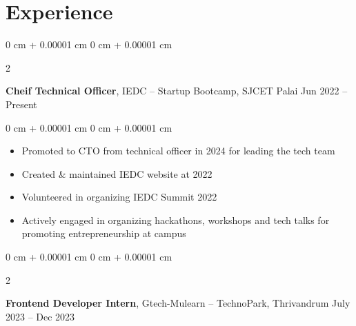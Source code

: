 \documentclass[10pt, letterpaper]{article}
\newenvironment{highlights}{
    \begin{itemize}[
        topsep=0.10 cm,
        parsep=0.10 cm,
        partopsep=0pt,
        itemsep=0pt,
        leftmargin=0 cm + 10pt
    ]
}{
    \end{itemize}
} %
\newenvironment{onecolentry}{
    \begin{adjustwidth}{
        0 cm + 0.00001 cm
    }{
        0 cm + 0.00001 cm
    }
}{
    \end{adjustwidth}
} %
\newenvironment{twocolentry}[2][]{
    \onecolentry
    \def\secondColumn{#2}
    \setcolumnwidth{\fill, 4.5 cm}
    \begin{paracol}{2}
}{
    \switchcolumn \raggedleft \secondColumn
    \end{paracol}
    \endonecolentry
} %
\begin{document}




\section{Experience}

\begin{twocolentry}{
        Jun 2022 – Present
    }
    \textbf{Cheif Technical Officer}, IEDC -- Startup Bootcamp, SJCET Palai\end{twocolentry}

\vspace{0.10 cm}
\begin{onecolentry}
    \begin{highlights}
        \item Promoted to CTO from technical officer in 2024 for leading the tech team
        \item Created \& maintained IEDC website at 2022
        \item Volunteered in organizing IEDC Summit 2022
        \item Actively engaged in organizing hackathons, workshops and tech talks for
        promoting entrepreneurship at campus
    \end{highlights}
\end{onecolentry}

\vspace{0.2 cm}

\begin{twocolentry}{
        July 2023 – Dec 2023
    }
    \textbf{Frontend Developer Intern}, Gtech-Mulearn -- TechnoPark, Thrivandrum\end{twocolentry}
\end{document}
